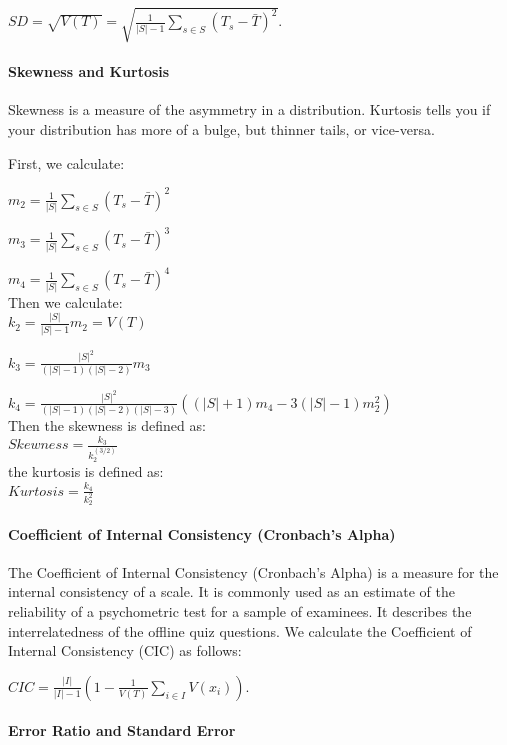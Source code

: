 \documentclass[12pt]{report}
\begin{document}
$SD = \sqrt{V(T)} = \sqrt{\frac{1}{|S| - 1}\sum\limits_{s\in S}(T_s - \bar{T})^2}$.

\paragraph{Skewness and Kurtosis}
Skewness is a measure of the asymmetry in a distribution. Kurtosis tells you if your distribution has more of a bulge, but thinner tails, or vice-versa. 

First, we calculate:

$m_2=\frac{1}{|S|}\sum\limits_{s\in S}{(T_s - \bar{T})^2}$

$m_3=\frac{1}{|S|}\sum\limits_{s\in S}{(T_s - \bar{T})^3}$

$m_4=\frac{1}{|S|}\sum\limits_{s\in S}{(T_s - \bar{T})^4}$\\

Then we calculate:\\

$k_2 = \frac{|S|}{|S| - 1}m_2 = V(T)$

$k_3 = \frac{|S|^2}{(|S|-1)(|S|-2)} m_3$

$k_4 = \frac{|S|^2}{(|S|-1)(|S|-2)(|S|-3)}\left((|S|+1)m_4-3(|S|-1)m_2^2\right)$\\

Then the skewness is defined as:\\

 $Skewness = \frac{k_3}{k_2^(3/2)}$\\

the kurtosis is defined as:\\

 $Kurtosis = \frac{k_4}{k_2^2}$


\paragraph{Coefficient of Internal Consistency (Cronbach's Alpha)}
The Coefficient of Internal Consistency (Cronbach's Alpha) is a measure for the internal consistency of a scale. It is commonly used as an estimate of the reliability of a psychometric test for a sample of examinees. It describes the  interrelatedness of the offline quiz questions. We calculate the Coefficient of Internal Consistency (CIC) as follows:

$CIC=\frac{|I|}{|I|-1}\left(1-\frac{1}{V(T)}\sum\limits_{i\in I}V(x_i)\right)$.


\paragraph{Error Ratio and Standard Error}
\end{document}
